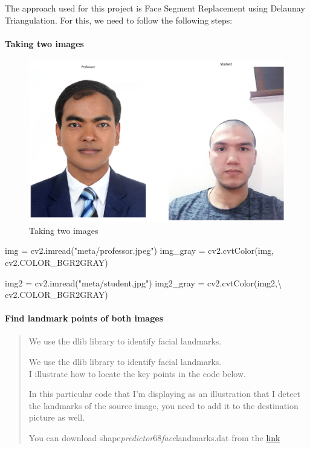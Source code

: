 \documentclass[12pt, a4paper, twocolumn]{article}
\newenvironment{Shaded}{}{}
\newcommand{\StringTok}[1]{\textcolor[rgb]{0.25,0.44,0.63}{#1}}
\newcommand{\OperatorTok}[1]{\textcolor[rgb]{0.40,0.40,0.40}{#1}}
\newcommand{\NormalTok}[1]{#1}
\let\oldparagraph\paragraph
\renewcommand{\paragraph}[1]{\oldparagraph{#1}\mbox{}}
\begin{document}
The approach used for this project is Face Segment Replacement using Delaunay Triangulation. For this, we need to follow the following steps:

\paragraph{Taking two images}\label{header-n438}

\begin{figure}
	\centering
	\includegraphics{meta/output_30_0.png}
	\caption{Taking two images}
\end{figure}

\begin{Shaded}
\small
\begin{Highlighting}[]
\NormalTok{img }\OperatorTok{=}\NormalTok{ cv2.imread(}\StringTok{"meta/professor.jpeg"}\NormalTok{)}
\NormalTok{img_gray }\OperatorTok{=}\NormalTok{ cv2.cvtColor(img, cv2.COLOR_BGR2GRAY)}

\NormalTok{img2 }\OperatorTok{=}\NormalTok{ cv2.imread(}\StringTok{"meta/student.jpg"}\NormalTok{)}
\NormalTok{img2_gray }\OperatorTok{=}\NormalTok{ cv2.cvtColor(img2,}\OperatorTok{\textbackslash{}}
\NormalTok{cv2.COLOR_BGR2GRAY)}
\end{Highlighting}
\end{Shaded}


\paragraph{Find landmark points of both images}\label{header-n150}

\begin{quote}
	We use the dlib library to identify facial landmarks.
	
	We use the dlib library to identify facial landmarks.\\
	I illustrate how to locate the key points in the code below.
	
	In this particular code that I'm displaying as an illustration that I
	detect the landmarks of the source image, you need to add it to the
	destination picture as well.
	
	You can download shape\emph{predictor}68\emph{face}landmarks.dat from
	the
	\href{https://github.com/AKSHAYUBHAT/TensorFace/blob/master/openface/models/dlib/shape_predictor_68_face_landmarks.dat}{link}
\end{quote}
\end{document}
